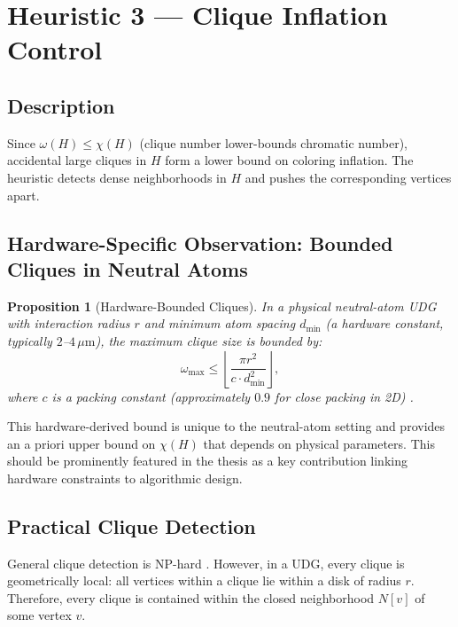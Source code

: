 \documentclass[11pt]{article}
\newtheorem{proposition}[theorem]{Proposition}
\begin{document}
\newpage

\section{Heuristic 3 — Clique Inflation Control}

\subsection{Description}

Since $\omega(H) \leq \chi(H)$ (clique number lower-bounds chromatic number),
accidental large cliques in $H$ form a lower bound on coloring inflation.
The heuristic detects dense neighborhoods in $H$ and pushes the corresponding
vertices apart.

\subsection{Hardware-Specific Observation: Bounded Cliques in Neutral Atoms}

\begin{proposition}[Hardware-Bounded Cliques]
In a physical neutral-atom UDG with interaction radius $r$ and minimum atom
spacing $d_{\min}$ (a hardware constant, typically $2$--$4\,\mu\mathrm{m}$),
the maximum clique size is bounded by:
\[
  \omega_{\max} \leq \left\lfloor \frac{\pi r^2}{c \cdot d_{\min}^2}
  \right\rfloor,
\]
where $c$ is a packing constant (approximately $0.9$ for close packing in 2D) \cite{Heppes2003}.
\end{proposition}

This hardware-derived bound is unique to the neutral-atom setting \cite{Henriet2021, Scholl2022}
and provides an a priori upper bound on $\chi(H)$ that depends on physical parameters. This
should be prominently featured in the thesis as a key contribution linking
hardware constraints to algorithmic design.

\subsection{Practical Clique Detection}

General clique detection is NP-hard \cite{Bomze1999}. However, in a UDG, every clique is
geometrically local: all vertices within a clique lie within a disk of radius
$r$. Therefore, every clique is contained within the closed neighborhood $N[v]$
of some vertex $v$.
\end{document}
